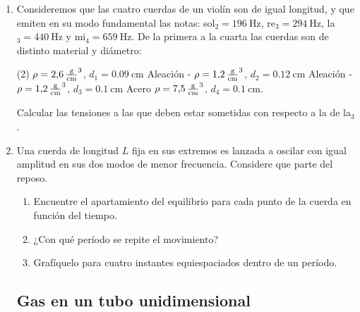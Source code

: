 \documentclass[11pt,spanish,a4paper]{article}
\begin{document}
\begin{enumerate}
\item Consideremos que las cuatro cuerdas de un violín son de igual longitud, y que emiten en su modo fundamental las notas: sol$_\text{2}= \SI{196}{\hertz}$, re$_\text{3}= \SI{294}{\hertz}$, la$_\text{3}= \SI{440}{\hertz}$ y mi$_\text{4}= \SI{659}{\hertz}$.
De la primera a la cuarta las cuerdas son de distinto material y diámetro:
\begin{tasks}[style=enumerate](2)
	\task {} \(\rho= \SI{2.6}{\gram\over\centi\metre\cubed}\), \(d_1= \SI{0,09}{\centi\metre}\)
	\task Aleación - $\rho = \SI{1.2}{\gram\over\centi\metre\cubed}$, $d_2 = \SI{0.12}{\centi\metre}$
	\task Aleación - $\rho = \SI{1.2}{\gram\over\centi\metre\cubed}$, $d_3 = \SI{0.1}{\centi\metre}$
	\task Acero $\rho = \SI{7.5}{\gram\over\centi\metre\cubed}$, $d_4 = \SI{0.1}{\centi\metre}$.
\end{tasks}
Calcular las tensiones a las que deben estar sometidas con respecto a la de la$_\text{3}$.


\item Una cuerda de longitud $L$ fija en sus extremos es lanzada a oscilar con igual amplitud en sus dos modos de menor frecuencia.
Considere que parte del reposo. 
\begin{enumerate}
	\item Encuentre el apartamiento del equilibrio para cada punto de la cuerda en función del tiempo.
	\item ¿Con qué período se repite el movimiento?
	\item Grafíquelo para cuatro instantes equiespaciados dentro de un período. 
\end{enumerate}


\subsection*{Gas en un tubo unidimensional}


\end{enumerate}
\end{document}
